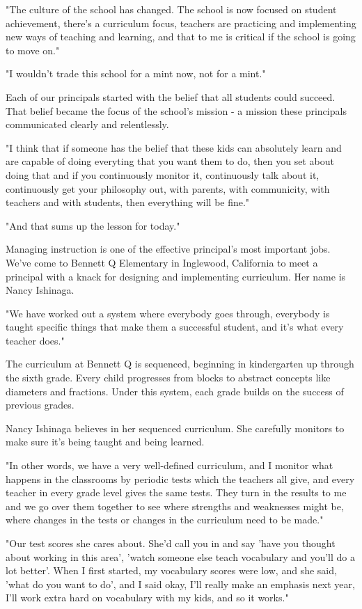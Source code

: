 "The culture of the school has changed. The school is now focused on student achievement, there's a curriculum focus, teachers are practicing and implementing new ways of teaching and learning, and that to me is critical if the school is going to move on."

"I wouldn't trade this school for a mint now, not for a mint."

Each of our principals started with the belief that all students could succeed. That belief became the focus of the school's mission - a mission these principals communicated clearly and relentlessly.

"I think that if someone has the belief that these kids can absolutely learn and are capable of doing everyting that you want them to do, then you set about doing that and if you continuously monitor it, continuously talk about it, continuously get your philosophy out, with parents, with communicity, with teachers and with students, then everything will be fine."

"And that sums up the lesson for today."

Managing instruction is one of the effective principal's most important jobs. We've come to Bennett Q Elementary in Inglewood, California to meet a principal with a knack for designing and implementing curriculum. Her name is Nancy Ishinaga.

"We have worked out a system where everybody goes through, everybody is taught specific things that make them a successful student, and it's what every teacher does."

The curriculum at Bennett Q is sequenced, beginning in kindergarten up through the sixth grade. Every child progresses from blocks to abstract concepts like diameters and fractions. Under this system, each grade builds on the success of previous grades.

Nancy Ishinaga believes in her sequenced curriculum. She carefully monitors to make sure it's being taught and being learned.

"In other words, we have a very well-defined curriculum, and I monitor what happens in the classrooms by periodic tests which the teachers all give, and every teacher in every grade level gives the same tests. They turn in the results to me and we go over them together to see where strengths and weaknesses might be, where changes in the tests or changes in the curriculum need to be made."

"Our test scores she cares about. She'd call you in and say 'have you thought about working in this area', 'watch someone else teach vocabulary and you'll do a lot better'. When I first started, my vocabulary scores were low, and she said, 'what do you want to do', and I said okay, I'll really make an emphasis next year, I'll work extra hard on vocabulary with my kids, and so it works."

